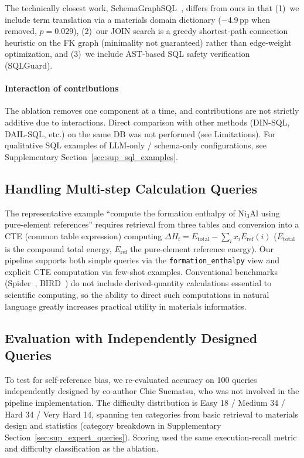 The technically closest work, SchemaGraphSQL~\cite{safdarian2026schemagraphsql}, differs from ours in that (1)~we include term translation via a materials domain dictionary ($-$4.9\,pp when removed, $p=0.029$), (2)~our JOIN search is a greedy shortest-path connection heuristic on the FK graph (minimality not guaranteed) rather than edge-weight optimization, and (3)~we include AST-based SQL safety verification (SQLGuard).

\paragraph*{Interaction of contributions}
The ablation removes one component at a time, and contributions are not strictly additive due to interactions. Direct comparison with other methods (DIN-SQL, DAIL-SQL, etc.) on the same DB was not performed (see Limitations). For qualitative SQL examples of LLM-only / schema-only configurations, see Supplementary Section~\ref{sec:sup_sql_examples}.

\subsection{Handling Multi-step Calculation Queries}
\label{sec:multistep_query}

The representative example ``compute the formation enthalpy of Ni$_3$Al using pure-element references'' requires retrieval from three tables and conversion into a CTE (common table expression) computing $\Delta H_\mathrm{f} = E_\mathrm{total} - \sum_i x_i E_\mathrm{ref}(i)$ ($E_\mathrm{total}$ is the compound total energy, $E_\mathrm{ref}$ the pure-element reference energy). Our pipeline supports both simple queries via the \texttt{formation\_enthalpy} view and explicit CTE computation via few-shot examples. Conventional benchmarks (Spider~\cite{yu2018spider}, BIRD~\cite{li2024bird}) do not include derived-quantity calculations essential to scientific computing, so the ability to direct such computations in natural language greatly increases practical utility in materials informatics.
\subsection{Evaluation with Independently Designed Queries}
\label{sec:independent_eval}

To test for self-reference bias, we re-evaluated accuracy on 100 queries independently designed by co-author Chie Suematsu, who was not involved in the pipeline implementation. The difficulty distribution is Easy 18 / Medium 34 / Hard 34 / Very Hard 14, spanning ten categories from basic retrieval to materials design and statistics (category breakdown in Supplementary Section~\ref{sec:sup_expert_queries}). Scoring used the same execution-recall metric and difficulty classification as the ablation.


